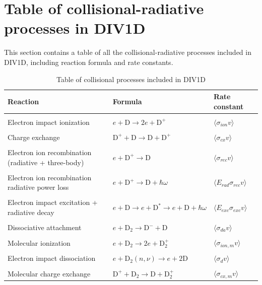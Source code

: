 \documentclass[amsmath,amssymb,a4]{revtex4-2}
\begin{document}
\newpage
\section{Table of collisional-radiative processes in DIV1D}
\label{sec: Appendix reaction rates table}
This section contains a table of all the collisional-radiative processes included in DIV1D, including reaction formula and rate constants. 

\begin{longtable}[c]{|l|l|l|}
\caption{Table of collisional processes included in DIV1D}\label{tab:rea_ref}\\ \hline
Reaction             & Formula & Rate constant \\
\hline
 & & \\
Electron impact ionization  & $e+\mathrm{D}\rightarrow2e+\mathrm{D}^+$ & $\langle \sigma_{ion} v\rangle $ \\
 & &\\
Charge exchange  & $\mathrm{D}^++\mathrm{D}\rightarrow\mathrm{D}+\mathrm{D}^+$ & $\langle \sigma_{cx} v\rangle $ \\
 & & \\
Electron ion recombination (radiative + three-body)  & $e+\mathrm{D}^+\rightarrow \mathrm{D}$ & $\langle \sigma_{rec} v\rangle $ \\
 & &\\
Electron ion recombination radiative power loss & $e+\mathrm{D}^+\rightarrow \mathrm{D} + \hbar\omega$ & $\langle E_{rad} \sigma_{rec} v\rangle $ \\
 & &\\
Electron impact excitation + radiative decay & $e+\mathrm{D}\rightarrow e + \mathrm{D}^* \rightarrow e+\mathrm{D}+ \hbar\omega$ & $\langle E_{exc} \sigma_{exc} v\rangle $\\
 & &\\
Dissociative attachment & $e+\text{D}_2\rightarrow \text{D}^-+\text{D}$ & $\langle \sigma_{da} v\rangle $   \\
 & &\\
Molecular ionization & $e+\text{D}_2\rightarrow 2e+\text{D}_2^+$ & $\langle \sigma_{ion, m} v\rangle $\\
 & &\\
Electron impact dissociation & $e+\text{D}_2(n,\nu)\rightarrow e+2\text{D}$ & $\langle \sigma_{d} v\rangle $\\
 & &\\
Molecular charge exchange & $\text{D}^++\text{D}_2\rightarrow \text{D} + \text{D}_2^+$ & $\langle \sigma_{cx,m} v\rangle $\\

\end{longtable}
\end{document}

